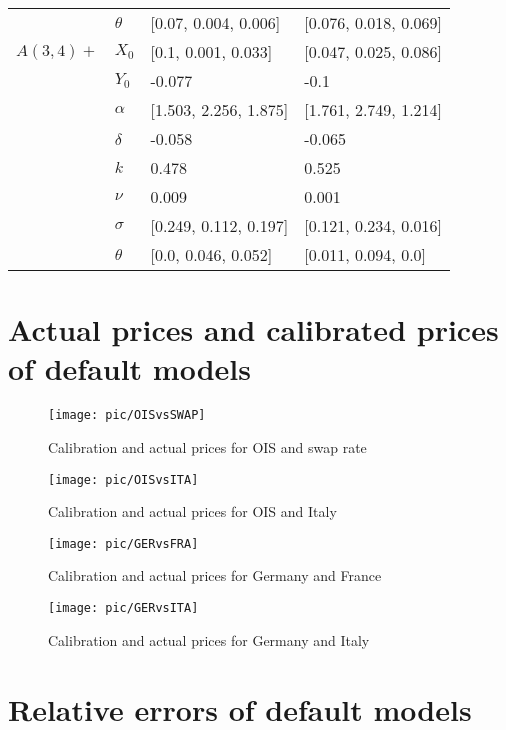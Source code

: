 \begin{tabular}{llll}
	& $\theta$ &   [0.07, 0.004, 0.006] &  [0.076, 0.018, 0.069] \\
	$A(3, 4)+$ & $X_0$ &    [0.1, 0.001, 0.033] &  [0.047, 0.025, 0.086] \\
	& $Y_0$ &                 -0.077 &                   -0.1 \\
	& $\alpha$ &  [1.503, 2.256, 1.875] &  [1.761, 2.749, 1.214] \\
	& $\delta$ &                 -0.058 &                 -0.065 \\
	& $k$ &                  0.478 &                  0.525 \\
	& $\nu$ &                  0.009 &                  0.001 \\
	& $\sigma$ &  [0.249, 0.112, 0.197] &  [0.121, 0.234, 0.016] \\
	& $\theta$ &    [0.0, 0.046, 0.052] &    [0.011, 0.094, 0.0] \\
	\bottomrule
\end{tabular}

\section{Actual prices and calibrated prices of default models}

\begin{figure}[H]
	\centering
	\texttt{[image: pic/OISvsSWAP]}
	\caption{Calibration and actual prices for OIS and swap rate}
	\label{fig:OISvsSWAP}
\end{figure}

\begin{figure}[H]
	\centering
	\texttt{[image: pic/OISvsITA]}
	\caption{Calibration and actual prices for OIS and Italy}
	\label{fig:OISvsSWAP}
\end{figure}


\begin{figure}[H]
	\centering
	\texttt{[image: pic/GERvsFRA]}
	\caption{Calibration and actual prices for Germany and France}
	\label{fig:GERvsFRA}
\end{figure}


\begin{figure}[H]
	\centering
	\texttt{[image: pic/GERvsITA]}
	\caption{Calibration and actual prices for Germany and Italy}
	\label{fig:GERvsITA}
\end{figure}

\section{Relative errors of default models}

